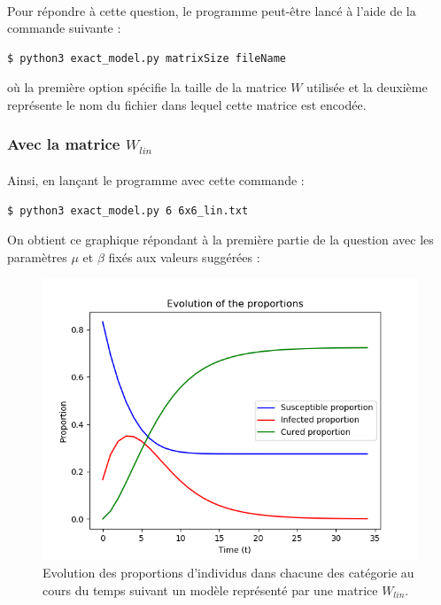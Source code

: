 \documentclass[a4paper, 12pt, oneside]{article}
\begin{document}
\paragraph{}Pour répondre à cette question, le programme peut-être lancé à l'aide de la commande suivante :

\begin{lstlisting}[language=bash]
$ python3 exact_model.py matrixSize fileName
\end{lstlisting}

\noindent où la première option spécifie la taille de la matrice $W$ utilisée et la deuxième représente le nom du fichier dans lequel cette matrice est encodée.

\subsubsection{Avec la matrice $W_{lin}$}

\paragraph{}Ainsi, en lançant le programme avec cette commande :

\begin{lstlisting}[language=bash]
$ python3 exact_model.py 6 6x6_lin.txt
\end{lstlisting}

\noindent On obtient ce graphique répondant à la première partie de la question avec les paramètres $\mu$ et $\beta$ fixés aux valeurs suggérées : 

\begin{figure}[H]
	\centering
	\includegraphics[scale=1]{lin_6x6.png} 
	\caption{Evolution des proportions d'individus dans chacune des catégorie au cours du temps suivant un modèle représenté par une matrice $W_{lin}$.}
\end{figure}
\end{document}
